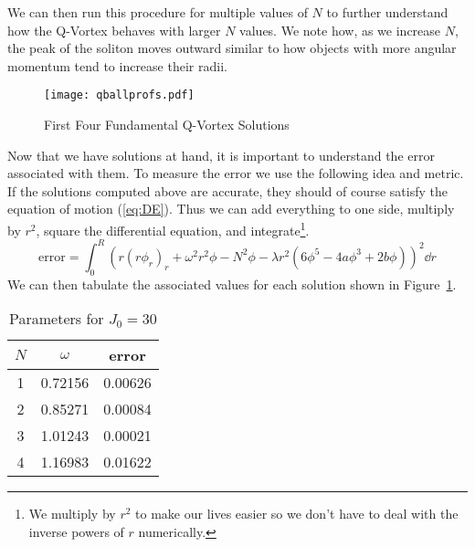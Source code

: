 We can then run this procedure for multiple values of \(N\) to further
understand how the Q-Vortex behaves with larger \(N\) values. We note how, as we
increase \(N\), the peak of the soliton moves outward similar to how objects
with more angular momentum tend to increase their radii.
\begin{figure}[H]
    \centering
    \texttt{[image: qballprofs.pdf]}
    \caption{First Four Fundamental Q-Vortex Solutions}\label{fig:profiles}
\end{figure}
Now that we have solutions at hand, it is important to understand the error
associated with them. To measure the error we use the following idea and metric.
If the solutions computed above are accurate, they should of course satisfy the
equation of motion (\ref{eq:DE}). Thus we can add everything to one side,
multiply by \(r^2\), square the differential equation, and integrate\footnote{We
    multiply by \(r^2\) to make our lives easier so we don't have to deal with the
    inverse powers of \(r\) numerically.}.
\begin{equation}
    \mathrm{error} = \int_0^R \left(r\left(r\phi_{r}\right)_r + \omega^2r^2\phi - N^2\phi - \lambda r^2\left(6\phi^5 - 4a\phi^3 + 2b\phi\right)\right)^2\dd{r}
\end{equation}
We can then tabulate the associated values for each solution shown in
Figure~\ref{fig:profiles}.
\begin{table}[H]
    \centering
    \begin{tabular}{c c c}            \toprule
        \(N\) & \(\omega\) & error   \\ \midrule
        1     & 0.72156    & 0.00626 \\ \midrule
        2     & 0.85271    & 0.00084 \\ \midrule
        3     & 1.01243    & 0.00021 \\ \midrule
        4     & 1.16983    & 0.01622 \\ \bottomrule
    \end{tabular}
    \caption{Parameters for \(J_0 = 30\)}\label{tab:params}
\end{table}

